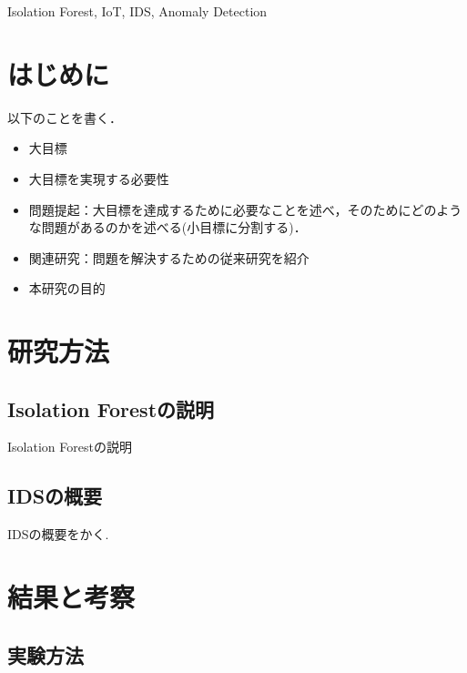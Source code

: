 \documentclass{css}
\begin{document}
\begin{ekeyword}
Isolation Forest, IoT, IDS, Anomaly Detection
\end{ekeyword}


\maketitle

\section{はじめに}
以下のことを書く．

\begin{itemize}
    \item 大目標
    \item 大目標を実現する必要性
    \item 問題提起：大目標を達成するために必要なことを述べ，そのためにどのような問題があるのかを述べる(小目標に分割する)．
    \item 関連研究：問題を解決するための従来研究を紹介
    \item 本研究の目的
\end{itemize}


\section{研究方法}

\subsection{Isolation Forestの説明}
Isolation Forestの説明

\subsection{IDSの概要}

IDSの概要をかく.


\section{結果と考察}

\subsection{実験方法}
\end{document}
